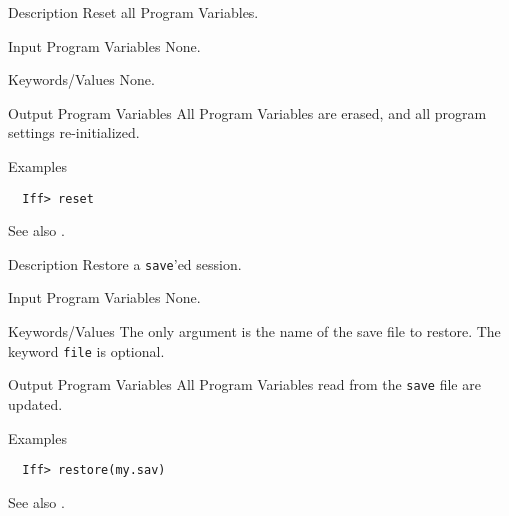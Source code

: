 \begin{IFFcom}
\item[Description] Reset all {\ifeffit} Program Variables.
\item[Input Program Variables] None.
\item[Keywords/Values] None.
\item[Output Program Variables] All Program Variables are erased, 
  and all program settings re-initialized.
\item[Examples] {\hspace{1.in} \vspace{-0.1truein} \relax }
\begin{verbatim} 
  Iff> reset
\end{verbatim} \noindent %
\item[See also] {}.
\end{IFFcom}



\begin{IFFcom}
\item[Description] Restore a {\tt{save}}'ed {\ifeffit} session.
\item[Input Program Variables] None.
\item[Keywords/Values]  The only argument is the name of the save file to
  restore.  The keyword {\tt{file}} is optional.
\item[Output Program Variables] All Program Variables read from the 
{\tt{save}} file are updated.
\item[Examples] {\hspace{1.in} \vspace{-0.1truein} \relax }
\begin{verbatim} 
  Iff> restore(my.sav)
\end{verbatim} \noindent %
\item[See also] {}.
\end{IFFcom}



